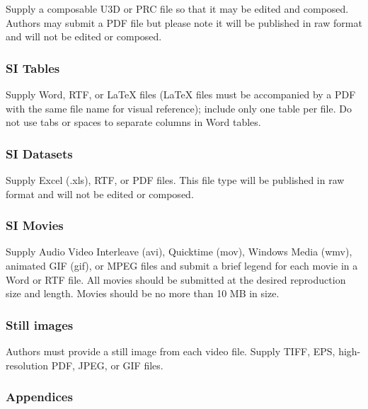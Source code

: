 \documentclass[9pt,twocolumn,twoside,]{pnas-new}
\begin{document}
Supply a composable U3D or PRC file so that it may be edited and
composed. Authors may submit a PDF file but please note it will be
published in raw format and will not be edited or composed.

\hypertarget{si-tables}{%
\subsubsection*{SI Tables}\label{si-tables}}

Supply Word, RTF, or LaTeX files (LaTeX files must be accompanied by a
PDF with the same file name for visual reference); include only one
table per file. Do not use tabs or spaces to separate columns in Word
tables.

\hypertarget{si-datasets}{%
\subsubsection*{SI Datasets}\label{si-datasets}}

Supply Excel (.xls), RTF, or PDF files. This file type will be published
in raw format and will not be edited or composed.

\hypertarget{si-movies}{%
\subsubsection*{SI Movies}\label{si-movies}}

Supply Audio Video Interleave (avi), Quicktime (mov), Windows Media
(wmv), animated GIF (gif), or MPEG files and submit a brief legend for
each movie in a Word or RTF file. All movies should be submitted at the
desired reproduction size and length. Movies should be no more than 10
MB in size.

\hypertarget{still-images}{%
\subsubsection*{Still images}\label{still-images}}

Authors must provide a still image from each video file. Supply TIFF,
EPS, high-resolution PDF, JPEG, or GIF files.

\hypertarget{appendices}{%
\subsubsection*{Appendices}\label{appendices}}
\end{document}
